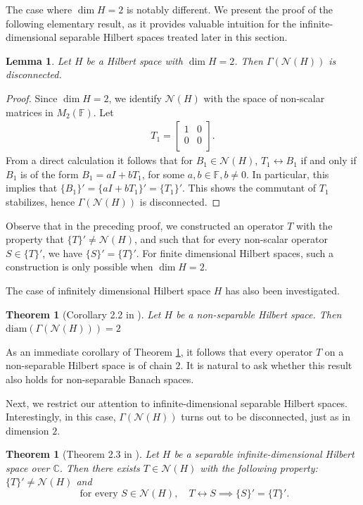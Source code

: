 \documentclass[a4paper,12pt]{article}
\newtheorem{theorem}[thm]{Theorem}
\newtheorem{lemma}[thm]{Lemma}
\theoremstyle{definition}
\numberwithin{equation}{section}
\numberwithin{thm}{section}
\newcommand{\C}{\mathbb{C}}
\begin{document}
The case where $\dim H=2$ is notably different. We present the proof of the following elementary result, as it provides valuable intuition for the infinite-dimensional separable Hilbert spaces treated later in this section.
\begin{lemma}
Let $H$ be a Hilbert space with $\dim H=2$. Then $\Gamma(\mathcal{N}(H))$ is disconnected.
\end{lemma}
\begin{proof}
Since $\dim H=2$, we identify $\mathcal{N}(H)$ with the space of non-scalar matrices in $M_2(\mathbb{F})$. Let 
\begin{align*}
T_1=\begin{bmatrix}
1 & 0\\
0 & 0 \\
\end{bmatrix}.
\end{align*}
From a direct calculation it follows that for $B_1 \in \mathcal{N}(H)$, $T_1\leftrightarrow B_1$ if and only if $B_1$ is of the form $B_1 = aI+bT_1$, for some $a,b\in \mathbb{F}, b\neq 0$. In particular, this implies that $\{B_1\}' = \{aI+bT_1\}' = \{T_1\}'$. This shows the commutant of $T_1$ stabilizes, hence $\Gamma(\mathcal{N}(H))$ is disconnected.
\end{proof}

Observe that in the preceding proof, we constructed an operator $T$ with the property that $\{T\}' \neq \mathcal{N}(H)$, and such that for every non-scalar operator $S\in \{T\}'$, we have $\{S\}'=\{T\}'$. For finite dimensional Hilbert spaces, such a construction is only possible when $\dim H=2$. 

The case of infinitely dimensional Hilbert space $H$ has also been investigated. 
\begin{theorem}[Corollary 2.2 in \cite{Ambrozie}] 
\label{nonseparableHilbert} Let $H$ be a non-separable Hilbert space. Then $\text{diam}(\Gamma(\mathcal{N}(H))) =2$
\end{theorem}

As an immediate corollary of Theorem \ref{nonseparableHilbert}, it follows that every operator $T$ on a non-separable Hilbert space is of chain $2$. It is natural to ask whether this result also holds for non-separable Banach spaces.

Next, we restrict our attention to infinite-dimensional separable Hilbert spaces. Interestingly, in this case, $\Gamma(\mathcal{N}(H))$ turns out to be disconnected, just as in dimension $2$.
\begin{theorem}[Theorem 2.3 in \cite{Ambrozie}]
\label{AmbrozieOperator}
Let $H$ be a separable infinite-dimensional Hilbert space over $\C$. Then there exists $T\in \mathcal{N}(H)$ with the following property: $\{T\}' \neq \mathcal{N}(H)$ and 
$$\text{ for every } S\in \mathcal{N}(H), \quad T\leftrightarrow S \implies \{S\}'=\{T\}'.$$
\end{theorem}
\end{document}
